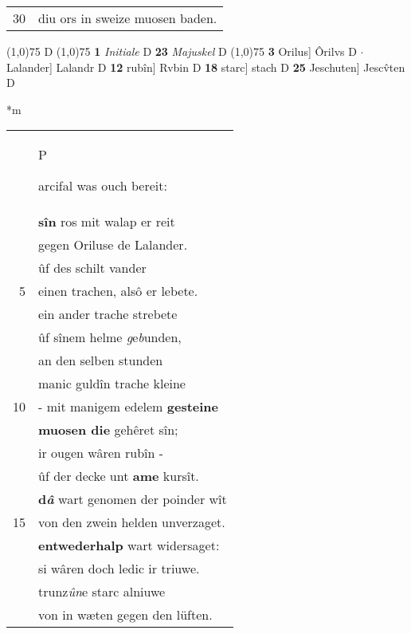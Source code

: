 \documentclass[8pt,a4paper,notitlepage]{article}
\begin{document}
\begin{table}[ht]
\begin{minipage}[t]{0.5\linewidth}
\begin{tabular}{rl}
30 & diu ors in sweize muosen baden.\\ 
\end{tabular}
\scriptsize
\line(1,0){75} \newline
D \newline
\line(1,0){75} \newline
\textbf{1} \textit{Initiale} D  \textbf{23} \textit{Majuskel} D  \newline
\line(1,0){75} \newline
\textbf{3} Orilus] Ôrilvs D  $\cdot$ Lalander] Lalandr D \textbf{12} rubîn] Rvbin D \textbf{18} starc] stach D \textbf{25} Jeschuten] Jescv̂ten D \newline
\end{minipage}
\hspace{0.5cm}
\begin{minipage}[t]{0.5\linewidth}
\small
\begin{center}*m
\end{center}
\begin{tabular}{rl}
 & \begin{large}P\end{large}arcifal was ouch bereit:\\ 
 & \textbf{sîn} ros mit walap er reit\\ 
 & gegen Oriluse de Lalander.\\ 
 & ûf des schilt vander\\ 
5 & einen trachen, alsô er lebete.\\ 
 & ein ander trache strebete\\ 
 & ûf sînem helme \textit{g}e\textit{b}unden,\\ 
 & an den selben stunden\\ 
 & manic guldîn trache kleine\\ 
10 & - mit manigem edelem \textbf{gesteine}\\ 
 & \textbf{muosen die} gehêret sîn;\\ 
 & ir ougen wâren rubîn -\\ 
 & ûf der decke unt \textbf{ame} kursît.\\ 
 & \textbf{d\textit{â}} wart genomen der poinder wît\\ 
15 & von den zwein helden unverzaget.\\ 
 & \textbf{entwederhalp} wart widersaget:\\ 
 & si wâren doch ledic ir triuwe.\\ 
 & trunz\textit{ûn}e starc alniuwe\\ 
 & von in wæten gegen den lüften.\\ 

\end{tabular}
\end{minipage}
\end{table}
\end{document}
